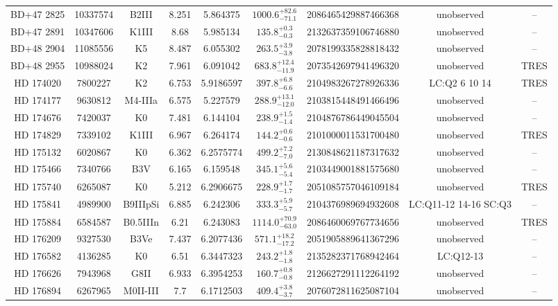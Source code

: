 \begin{table*}
\begin{tabular}{ccccccccc}
BD+47 2825 & 10337574 & B2III & 8.251 & 5.864375 & $1000.6^{+82.6}_{-71.1}$ & 2086465429887466368 & unobserved & -- \\
BD+47 2891 & 10347606 & K1III & 8.68 & 5.985134 & $135.8^{+0.3}_{-0.3}$ & 2132637359106746880 & unobserved & -- \\
BD+48 2904 & 11085556 & K5 & 8.487 & 6.055302 & $263.5^{+3.9}_{-3.8}$ & 2078199335828818432 & unobserved & -- \\
BD+48 2955 & 10988024 & K2 & 7.961 & 6.091042 & $683.8^{+12.4}_{-11.9}$ & 2073542697941496320 & unobserved & TRES \\
HD 174020 & 7800227 & K2 & 6.753 & 5.9186597 & $397.8^{+6.8}_{-6.6}$ & 2104983267278926336 & LC:Q2 6 10 14 & TRES \\
HD 174177 & 9630812 & M4-IIIa & 6.575 & 5.227579 & $288.9^{+13.1}_{-12.0}$ & 2103815448491466496 & unobserved & -- \\
HD 174676 & 7420037 & K0 & 7.481 & 6.144104 & $238.9^{+1.5}_{-1.4}$ & 2104876786449045504 & unobserved & -- \\
HD 174829 & 7339102 & K1III & 6.967 & 6.264174 & $144.2^{+0.6}_{-0.6}$ & 2101000011531700480 & unobserved & TRES \\
HD 175132 & 6020867 & K0 & 6.362 & 6.2575774 & $499.2^{+7.2}_{-7.0}$ & 2130848621187317632 & unobserved & -- \\
HD 175466 & 7340766 & B3V & 6.165 & 6.159548 & $345.1^{+5.6}_{-5.4}$ & 2103449001881575680 & unobserved & -- \\
HD 175740 & 6265087 & K0 & 5.212 & 6.2906675 & $228.9^{+1.7}_{-1.7}$ & 2051085757046109184 & unobserved & TRES \\
HD 175841 & 4989900 & B9IIIpSi & 6.885 & 6.242306 & $333.3^{+5.9}_{-5.7}$ & 2104376989694932608 & LC:Q11-12 14-16 SC:Q3 & -- \\
HD 175884 & 6584587 & B0.5IIIn & 6.21 & 6.243083 & $1114.0^{+70.9}_{-63.0}$ & 2086460069767734656 & unobserved & TRES \\
HD 176209 & 9327530 & B3Ve & 7.437 & 6.2077436 & $571.1^{+18.2}_{-17.2}$ & 2051905889641367296 & unobserved & -- \\
HD 176582 & 4136285 & K0 & 6.51 & 6.3447323 & $243.2^{+1.8}_{-1.8}$ & 2135282371768942464 & LC:Q12-13 & -- \\
HD 176626 & 7943968 & G8II & 6.933 & 6.3954253 & $160.7^{+0.8}_{-0.8}$ & 2126627291112264192 & unobserved & -- \\
HD 176894 & 6267965 & M0II-III & 7.7 & 6.1712503 & $409.4^{+3.8}_{-3.7}$ & 2076072811625087104 & unobserved & -- \\

\end{tabular}
\end{table*}
